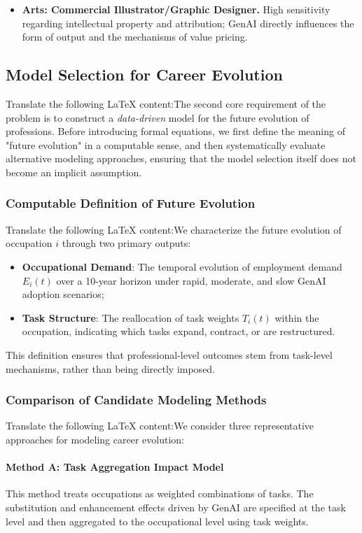 \begin{itemize}
    \item \textbf{Arts: Commercial Illustrator/Graphic Designer.}
    High sensitivity regarding intellectual property and attribution; GenAI directly influences the form of output and the mechanisms of value pricing.
\end{itemize}\subsection{Model Selection for Career Evolution}Translate the following LaTeX content:The second core requirement of the problem is to construct a \emph{data-driven} model for the future evolution of professions.  
Before introducing formal equations, we first define the meaning of "future evolution" in a computable sense, and then systematically evaluate alternative modeling approaches, ensuring that the model selection itself does not become an implicit assumption.\subsubsection{Computable Definition of Future Evolution}Translate the following LaTeX content:We characterize the future evolution of occupation \(i\) through two primary outputs:
\begin{itemize}
    \item \textbf{Occupational Demand}: The temporal evolution of employment demand \(E_i(t)\) over a 10-year horizon under rapid, moderate, and slow GenAI adoption scenarios;
    \item \textbf{Task Structure}: The reallocation of task weights \(T_i(t)\) within the occupation, indicating which tasks expand, contract, or are restructured.
\end{itemize}This definition ensures that professional-level outcomes stem from task-level mechanisms, rather than being directly imposed.\subsubsection{Comparison of Candidate Modeling Methods}Translate the following LaTeX content:We consider three representative approaches for modeling career evolution:\paragraph{Method A: Task Aggregation Impact Model}This method treats occupations as weighted combinations of tasks.  
The substitution and enhancement effects driven by GenAI are specified at the task level and then aggregated to the occupational level using task weights.  
